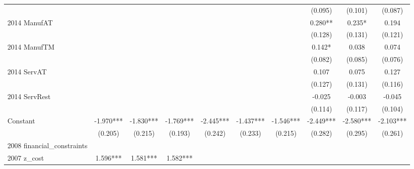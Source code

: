 \begin{table}[htbp]
\begin{tabular}{l*{9}{c}}
                    &               &               &               &               &               &               &     (0.095)   &     (0.101)   &     (0.087)   \\
2014 ManufAT        &               &               &               &               &               &               &       0.280** &       0.235*  &       0.194   \\
                    &               &               &               &               &               &               &     (0.128)   &     (0.131)   &     (0.121)   \\
2014 ManufTM        &               &               &               &               &               &               &       0.142*  &       0.038   &       0.074   \\
                    &               &               &               &               &               &               &     (0.082)   &     (0.085)   &     (0.076)   \\
2014 ServAT         &               &               &               &               &               &               &       0.107   &       0.075   &       0.127   \\
                    &               &               &               &               &               &               &     (0.127)   &     (0.131)   &     (0.116)   \\
2014 ServRest       &               &               &               &               &               &               &      -0.025   &      -0.003   &      -0.045   \\
                    &               &               &               &               &               &               &     (0.114)   &     (0.117)   &     (0.104)   \\
Constant            &      -1.970***&      -1.830***&      -1.769***&      -2.445***&      -1.437***&      -1.546***&      -2.449***&      -2.580***&      -2.103***\\
                    &     (0.205)   &     (0.215)   &     (0.193)   &     (0.242)   &     (0.233)   &     (0.215)   &     (0.282)   &     (0.295)   &     (0.261)   \\
\hline
2008 financial\_constraints&               &               &               &               &               &               &               &               &               \\
2007 z\_cost         &       1.596***&       1.581***&       1.582***&               &               &               &               &               &               \\

\end{tabular}
\end{table}
